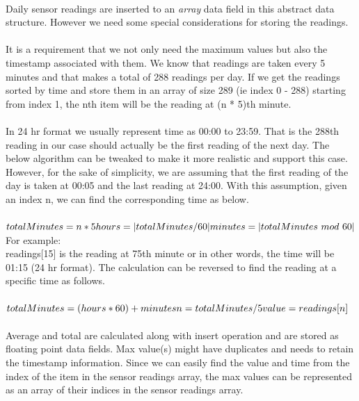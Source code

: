 \documentclass[12pt]{article}
\begin{document}
\paragraph{}Daily sensor readings are inserted to an {\em array} data field in this abstract data structure. However we need some special considerations for storing the readings.
\paragraph{}It is a requirement that we not only need the maximum values but also the timestamp associated with them. We know that readings are taken every 5 minutes and that makes a total of 288 readings per day. If we get the readings sorted by time and store them in an array of size 289 (ie index 0 - 288) starting from index 1, the nth item will be the reading at (n * 5)th minute.
\paragraph{}In 24 hr format we usually represent time as 00:00 to 23:59. That is the 288th reading in our case should actually be the first reading of the next day. The below algorithm can be tweaked to make it more realistic and support this case. However, for the sake of simplicity, we are assuming that the first reading of the day is taken at 00:05 and the last reading at 24:00. With this assumption, given an index n, we can find the corresponding time as below.\\ \\
\begin{math}
totalMinutes = n * 5 \\
hours = | totalMinutes / 60 | \\
minutes = | totalMinutes\ mod\ 60 | \\
\end{math}
\\
For example:\\
readings[15] is the reading at 75th minute or in other words, the time will be 01:15 (24 hr format). The calculation can be reversed to find the reading at a specific time as follows.\\ \\
\begin{math}
totalMinutes = (hours * 60) + minutes\\
n = totalMinutes / 5\\
value = readings[n]\\
\end{math}
\paragraph{}Average and total are calculated along with insert operation and are stored as floating point data fields. Max value(s) might have duplicates and needs to retain the timestamp information. Since we can easily find the value and time from the index of the item in the sensor readings array, the max values can be represented as an array of their indices in the sensor readings array.
\end{document}
